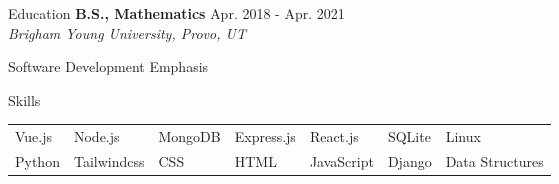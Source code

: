 \documentclass{resume} %
\begin{document}
\begin{rSection}{Education}
{\bf B.S., Mathematics }\hfill {Apr. 2018 - Apr. 2021} \\
\textit{Brigham Young University, Provo, UT}
    \begin{compactitem}
        \item Software Development Emphasis
    \end{compactitem}
\end{rSection}

\begin{rSection}{Skills}
        \begin{tabular}{ l l l l l l l }
            Vue.js & Node.js     & MongoDB  & Express.js & React.js   & SQLite   &  Linux\\  
            Python & Tailwindcss &  CSS & HTML & JavaScript &  Django & Data Structures
        \end{tabular}
\end{rSection}
\end{document}

